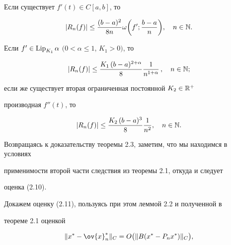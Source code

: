 \begin{lems}


Если существует $f'(t)\in C[a,b]$, то


\begin{equation}


|R_n(f)|\leq \frac{(b-a)^2}{8n}\omega\bigg(f';\frac{b-a}{n}\bigg),


\quad n\in \bl{N}.


\end{equation}


\end{lems}





\begin{cornonum}


Если $f'\in\operatorname{Lip}_{K_1}\alpha$ $(0<\alpha \leq 1$, $K_1>0)$, то


\begin{equation}


|R_n(f)|\leq \frac{K_1\, (b-a)^{2+\alpha}}{8}


\frac{1}{n^{1+\alpha}}\, ,\quad n\in \bl{N};


\end{equation}


если же существует вторая ограниченная постоянной $K_2\in \Bbb{R}^+$


производная $f''(t)$, то


\begin{equation}


|R_n(f)|\leq \frac{K_2\, (b-a)^3}{8} \frac{1}{n^2}, \quad n\in \bl{N}.


\end{equation}


\end{cornonum}





Возвращаясь к доказательству теоремы 2.3, заметим, что мы находимся в условиях


применимости второй части следствия из теоремы 2.1, откуда и следует


оценка (2.10).





Докажем оценку (2.11), пользуясь при этом леммой 2.2 и полученной в


теореме 2.1 оценкой


\begin{equation}


\|x^*-\ov{x}^*_n\|_C=O\bigl(\|B(x^*-P_nx^*)\|_C\bigr),


\end{equation}


